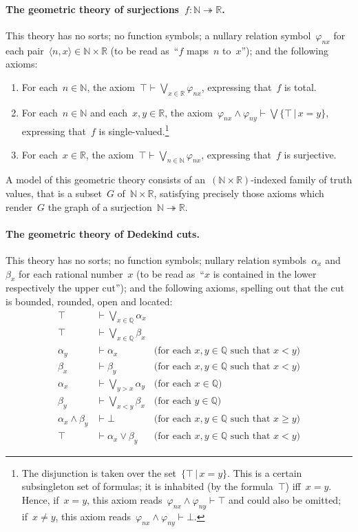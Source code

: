 \documentclass{ws-rv9x6}
\newcommand{\NN}{\mathbb{N}}
\newcommand{\QQ}{\mathbb{Q}}
\newcommand{\RR}{\mathbb{R}}
\renewcommand{\_}{\mathpunct{.}}
\newcommand{\?}{\,{:}\,}
\begin{document}
\paragraph{The geometric theory of surjections~$f : \NN \twoheadrightarrow
\RR$.} This theory has no
sorts; no function symbols; a nullary relation symbol~$\varphi_{nx}$ for each
pair~$\langle n,x \rangle \in \NN \times \RR$ (to be read as~``$f$ maps~$n$
to~$x$''); and the following axioms:
\begin{enumerate}
\item For each~$n \in \NN$, the axiom~$\top \vdash \bigvee_{x \in \RR}
\varphi_{nx}$, expressing that~$f$ is total.
\item For each~$n \in \NN$ and each~$x,y \in \RR$, the axiom~$\varphi_{nx}
\wedge \varphi_{ny} \vdash \bigvee\{ \top \,|\, x = y \}$,
expressing that~$f$ is single-valued.\footnote{The disjunction is taken over
the set~$\{ \top \,|\, x = y \}$. This is a certain subsingleton set of
formulas; it is inhabited (by the formula~$\top$) iff~$x = y$. Hence, if~$x =
y$, this axiom reads~$\varphi_{nx}
\wedge \varphi_{ny} \vdash \top$ and could also be omitted; if~$x \neq y$,
this axiom reads~$\varphi_{nx} \wedge \varphi_{ny} \vdash \bot$.}
\item For each~$x \in \RR$, the axiom~$\top \vdash \bigvee_{n \in \NN}
\varphi_{nx}$, expressing that~$f$ is surjective.
\end{enumerate}

A model of this geometric theory consists of an~$(\NN \times \RR)$-indexed
family of truth values, that is a subset~$G$ of~$\NN \times \RR$, satisfying
precisely those axioms which render~$G$ the graph of a surjection~$\NN
\twoheadrightarrow \RR$.

\paragraph{The geometric theory of Dedekind cuts.}\label{par:dedekind-cuts}
This theory has no sorts; no
function symbols; nullary relation symbols~$\alpha_x$ and~$\beta_x$ for each
rational number~$x$ (to be read as~``$x$ is contained in the lower respectively
the upper cut''); and the following axioms, spelling out that the cut is bounded,
rounded, open and located:
\begin{align*}
  \top &\vdash \textstyle\bigvee_{x \in \QQ} \alpha_x \\
  \top &\vdash \textstyle\bigvee_{x \in \QQ} \beta_x \\
  \alpha_y &\vdash \alpha_x & \text{(for each~$x,y \in \QQ$ such that~$x < y$)} \\
  \beta_x &\vdash \beta_y & \text{(for each~$x,y \in \QQ$ such that~$x < y$)} \\
  \alpha_x &\vdash \textstyle\bigvee_{y > x} \alpha_y & \text{(for each~$x \in \QQ$)} \\
  \beta_y &\vdash \textstyle\bigvee_{x < y} \beta_x & \text{(for each~$y \in \QQ$)} \\
  \alpha_x \wedge \beta_y &\vdash \bot & \text{(for each~$x,y \in \QQ$ such that~$x \geq y$)} \\
  \top &\vdash \alpha_x \vee \beta_y & \text{(for each~$x,y \in \QQ$ such that~$x < y$)}
\end{align*}
\end{document}
